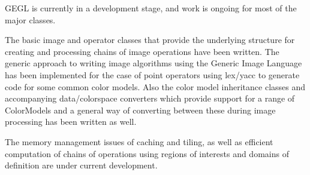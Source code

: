 GEGL is currently in a development stage, and work is ongoing for most of the
major classes.

The basic image and operator classes that provide the underlying structure for
creating and processing chains of image operations have been written. The
generic approach to writing image algorithms using the Generic Image Language
has been implemented for the case of point operators using lex/yacc to generate
code for some common color models.  Also the color model inheritance classes
and accompanying data/colorspace converters which provide support for a range
of ColorModels and a general way of converting between these during image
processing has been written as well.

The memory management issues of caching and tiling, as well as efficient
computation of chains of operations using regions of interests and domains of
definition are under current development.
